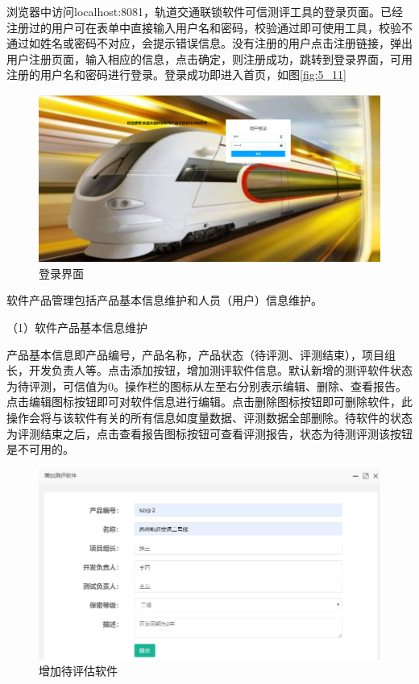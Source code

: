浏览器中访问localhost:8081，轨道交通联锁软件可信测评工具的登录页面。已经注册过的用户可在表单中直接输入用户名和密码，校验通过即可使用工具，校验不通过如姓名或密码不对应，会提示错误信息。没有注册的用户点击注册链接，弹出用户注册页面，输入相应的信息，点击确定，则注册成功，跳转到登录界面，可用注册的用户名和密码进行登录。登录成功即进入首页，如图\ref{fig:5_11}
\begin{figure}[htb]
	\centering
	\includegraphics[width=13cm]{fig/5_13.png}
	\caption{登录界面}
	\label{fig:5_14}
\end{figure}



软件产品管理包括产品基本信息维护和人员（用户）信息维护。

（1）软件产品基本信息维护

产品基本信息即产品编号，产品名称，产品状态（待评测、评测结束），项目组长，开发负责人等。点击添加按钮，增加测评软件信息。默认新增的测评软件状态为待评测，可信值为0。操作栏的图标从左至右分别表示编辑、删除、查看报告。点击编辑图标按钮即可对软件信息进行编辑。点击删除图标按钮即可删除软件，此操作会将与该软件有关的所有信息如度量数据、评测数据全部删除。待软件的状态为评测结束之后，点击查看报告图标按钮可查看评测报告，状态为待测评测该按钮是不可用的。
\begin{figure}[htb]
	\centering
	\includegraphics[width=13cm]{fig/sy5_12.png}
	\caption{增加待评估软件}
	\label{fig:5_12}
\end{figure}


